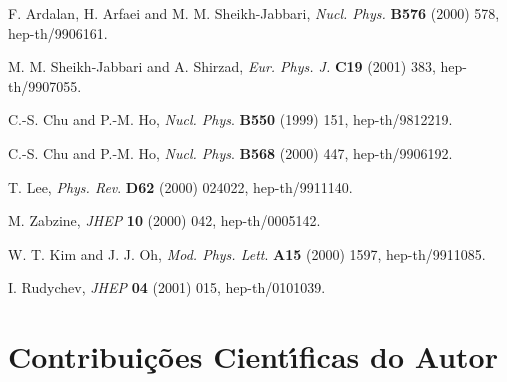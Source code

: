 \documentclass[a4paper,thmsa,12pt]{report}
\begin{document}
\begin{thebibliography}{99}
  F. Ardalan, H. Arfaei and M. M. Sheikh-Jabbari, \textit{%
Nucl. Phys.} \textbf{B576} (2000) 578, hep-th/9906161.

  M. M. Sheikh-Jabbari and A. Shirzad, \textit{Eur. Phys. J.} 
\textbf{C19} (2001) 383, hep-th/9907055.

  C.-S. Chu and P.-M. Ho, \textit{Nucl. Phys}. \textbf{B550} 
(1999) 151, hep-th/9812219.

  C.-S. Chu and P.-M. Ho, \textit{Nucl. Phys}. \textbf{B568} 
(2000) 447, hep-th/9906192.

  T. Lee, \textit{Phys. Rev}. \textbf{D62} (2000) 024022,
hep-th/9911140.

  M. Zabzine, \textit{JHEP }\textbf{10} (2000) 042,
hep-th/0005142.

  W. T. Kim and J. J. Oh, \textit{Mod. Phys. Lett}. \textbf{A15} 
(2000) 1597, hep-th/9911085.

  I. Rudychev, \textit{JHEP} \textbf{04} (2001) 015,
hep-th/0101039. 
\end{thebibliography}


\newpage

\section*{\sc Contribui\c c\~oes Cient\'{\i}ficas do Autor}
\end{document}
